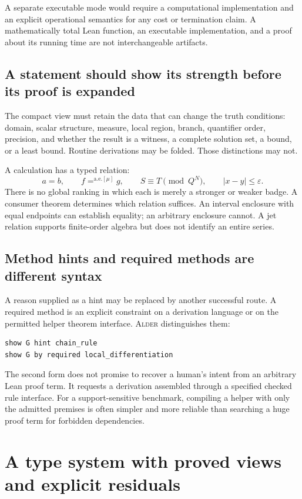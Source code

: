 \documentclass[11pt,a4paper]{article}
\newcommand{\Alder}{\textsc{Alder}}
\newcommand{\kw}[1]{\textsf{#1}}
\theoremstyle{plain}
\theoremstyle{definition}
\theoremstyle{remark}
\begin{document}
A separate \kw{executable} mode would require a computational implementation and an explicit operational semantics for any cost or termination claim. A mathematically total Lean function, an executable implementation, and a proof about its running time are not interchangeable artifacts.

\subsection{A statement should show its strength before its proof is expanded}
The compact view must retain the data that can change the truth conditions: domain, scalar structure, measure, local region, branch, quantifier order, precision, and whether the result is a witness, a complete solution set, a bound, or a least bound. Routine derivations may be folded. Those distinctions may not.

A calculation has a typed relation:
\[
 a=b,\qquad f=^{\mathrm{a.e.}[\mu]}g,\qquad
 S\equiv T\pmod{Q^N},\qquad |x-y|\le\varepsilon.
\]
There is no global ranking in which each is merely a stronger or weaker badge. A consumer theorem determines which relation suffices. An interval enclosure with equal endpoints can establish equality; an arbitrary enclosure cannot. A jet relation supports finite-order algebra but does not identify an entire series.

\subsection{Method hints and required methods are different syntax}
A reason supplied as a hint may be replaced by another successful route. A required method is an explicit constraint on a derivation language or on the permitted helper theorem interface. \Alder{} distinguishes them:
\Needspace{72pt}
\begin{lstlisting}
show G hint chain_rule
show G by required local_differentiation
\end{lstlisting}
The second form does not promise to recover a human's intent from an arbitrary Lean proof term. It requests a derivation assembled through a specified checked rule interface. For a support-sensitive benchmark, compiling a helper with only the admitted premises is often simpler and more reliable than searching a huge proof term for forbidden dependencies.

\section{A type system with proved views and explicit residuals}\label{sec:types}
\end{document}
